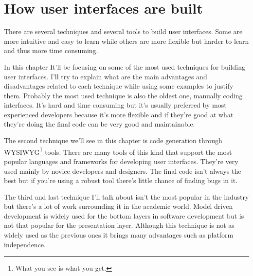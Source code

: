 \section{How user interfaces are built}
\label{section:How_user_interfaces_are_built}
There are several techniques and several tools to build user interfaces. Some are more intuitive and easy to learn while others are more flexible but harder to learn and thus more time consuming.

In this chapter It'll be focusing on some of the most used techniques for building user interfaces. I'll try to explain what are the main advantages and disadvantages related to each technique while using some examples to justify them.
Probably the most used technique is also the oldest one, manually coding interfaces. It's hard and time consuming but it's usually preferred by most experienced developers because it's more flexible and if they're good at what they're doing the final code can be very good and maintainable.

The second technique we'll see in this chapter is code generation through WYSIWYG\footnote{What you see is what you get.} tools. There are many tools of this kind that support the most popular languages and frameworks for developing user interfaces. They're very used mainly by novice developers and designers. The final code isn't always the best but if you're using a robust tool there's little chance of finding bugs in it.

The third and last technique I'll talk about isn't the most popular in the industry but there's a lot of work surrounding it in the academic world. Model driven development is widely used for the bottom layers in software development but is not that popular for the presentation layer. Although this technique is not as widely used as the previous ones it brings many advantages such as platform independence.



